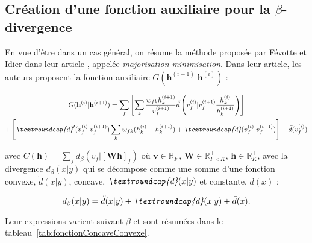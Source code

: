 \subsection{Création d'une fonction auxiliaire pour la $\beta$-divergence}\label{part:sub_fonction_aux}

En vue d'être dans un cas général, on résume la méthode proposée par Févotte et Idier dans leur article \cite{fevotte_algorithms_2011}, appelée \textit{majorisation-minimisation}. Dans leur article, les auteurs proposent la fonction auxiliaire $G(\mathbf{h}^{(i+1)}\vert \mathbf{h}^{(i)})$ : 

\begin{multline}\label{eq:fonction_auxiliaire}
G(\mathbf{h}^{(i)}\vert \mathbf{h}^{(i+1)}) = \sum_f \left[ \sum_k \frac{w_{fk}h_k^{(i+1)}}{v_f^{(i+1)}} \breve{d}\left(v_f^{(i)}\vert v_f^{(i+1)}\frac{h_k^{(i)}}{h_k^{(i+1)}} \right) \right]\\
+ \left[ \textit{\textroundcap{d}}'(v_f^{(i)}\vert v_f^{(i+1)})
\sum_k w_{fk} (h_k^{(i)}-h_k^{(i+1)})
+ \textit{\textroundcap{d}}(v_f^{(i)}\vert v_f^{(i+1)})\right] +\bar{d}(v_f^{(i)})
\end{multline}

avec $C(\mathbf{h}) = \sum_f d_{\beta}\left(v_f \vert \left[ \mathbf{Wh} \right]_f \right)$ où $\textbf{v} \in \mathbb{R}^+_F$, $\textbf{W} \in \mathbb{R}^+_{F\times K}$, $\textbf{h} \in \mathbb{R}^+_K$, avec la divergence $d_{\beta}(x \vert y)$ qui se décompose comme une somme d'une fonction convexe,  $\breve{d}(x\vert y)$, concave, $\textit{\textroundcap{d}}(x\vert y)$ et constante, $\bar{d}(x)$ : 

\begin{equation}
d_{\beta}(x\vert y) = \breve{d}(x\vert y) + \textit{\textroundcap{d}}(x\vert y) + \bar{d}(x).
\end{equation}

Leur expressions varient suivant $\beta$ et sont résumées dans le tableau~\ref{tab:fonctionConcaveConvexe}.\\

